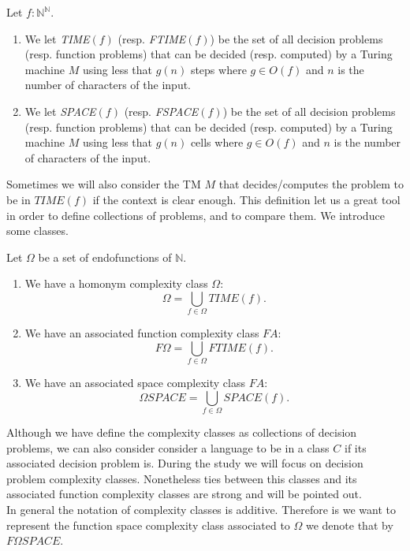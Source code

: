 \begin{definition}
  Let $f:\mathbb{N}^\mathbb{N}$.
\begin{enumerate}
  \item We let \emph{TIME}$(f)$ (resp. \emph{FTIME}$(f)$) be the set of all decision  problems (resp. function problems) that can be decided (resp. computed) by a Turing machine $M$ using less that $g(n)$ steps where $g\in O(f)$ and $n$ is the number of characters of the input.  
  \item We let \emph{SPACE}$(f)$ (resp. \emph{FSPACE}$(f)$) be the set of all decision problems (resp. function problems) that can be decided (resp. computed) by a Turing machine $M$ using less that $g(n)$ cells where $g\in O(f)$ and $n$ is the number of characters of the input.  
  \end{enumerate}

\end{definition}

Sometimes we will also consider the TM $M$ that decides/computes the problem to be in $TIME(f)$ if the context is clear enough. This definition let us a great tool in order to define collections of problems, and to compare them. We introduce some classes.
\begin{definition}
  Let $\Omega$ be a set of endofunctions of $\mathbb{N}$.
  \begin{enumerate}
  \item We have a homonym complexity class $\Omega$:
  $$\Omega =  \bigcup_{f \in \Omega} TIME(f). $$
  \item We have an associated function complexity class $FA$:
    $$F\Omega =  \bigcup_{f \in \Omega} FTIME(f).$$
  \item We have an associated space complexity class $FA$:
    $$\Omega SPACE =  \bigcup_{f \in \Omega} SPACE(f).$$  \end{enumerate}
\end{definition}


Although we have define the complexity classes as collections of decision problems, we can also consider consider a language to be in a class $C$ if its associated decision problem is. During the study we will focus on decision problem complexity classes. Nonetheless ties between this classes and its associated function complexity classes are strong and will be pointed out.\\

In general the notation of complexity classes is additive. Therefore is we want to represent the function space complexity class associated to $\Omega$ we denote that by $F\Omega SPACE$.\\


